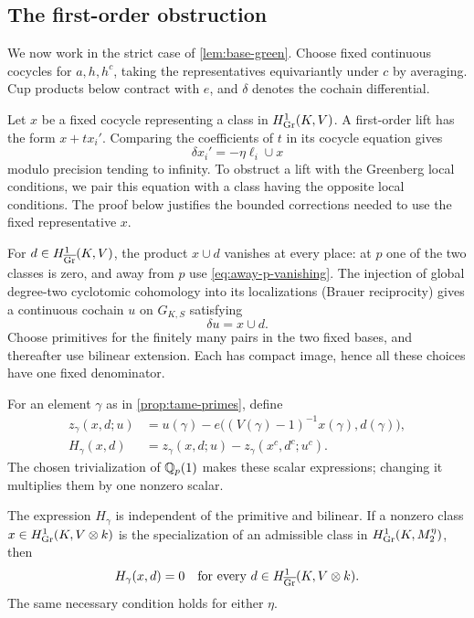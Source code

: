 \subsection{The first-order obstruction}

We now work in the strict case of \cref{lem:base-green}.  Choose
fixed continuous cocycles for $a,h,h^c$, taking the representatives
equivariantly under $c$ by averaging.  Cup products below contract
with $e$, and $\delta$ denotes the cochain differential.

Let $x$ be a fixed cocycle representing a class in
$H^1_{\operatorname{Gr}}(K,V)$.  A first-order lift has the form $x+t x_i'$.
Comparing the coefficients of $t$ in its cocycle
equation gives
\begin{equation}\label{eq:linear-lift}
 \delta x_i'=-\eta\ell_i\cup x
\end{equation}
modulo precision tending to infinity.  To obstruct a lift with the
Greenberg local conditions, we pair this equation with a class
having the opposite local conditions.  The proof below justifies
the bounded corrections needed to use the fixed representative $x$.

For $d\in H^1_{\overline{\operatorname{Gr}}}(K,V)$, the
product $x\cup d$ vanishes at every place: at $p$ one of the two
classes is zero, and away from $p$ use
\cref{eq:away-p-vanishing}.  The injection of global degree-two
cyclotomic cohomology into its localizations (Brauer reciprocity)
gives a continuous cochain $u$ on $G_{K,S}$ satisfying
\begin{equation}\label{eq:cup-primitive}
 \delta u=x\cup d.
\end{equation}
Choose primitives for the finitely many pairs in the two fixed
bases, and thereafter use bilinear extension.  Each has compact
image, hence all these choices have one fixed denominator.

For an element $\gamma$ as in \cref{prop:tame-primes}, define
\begin{align}
 z_\gamma(x,d;u)
 &=u(\gamma)-e\bigl((V(\gamma)-1)^{-1}x(\gamma),d(\gamma)\bigr),
 \label{eq:corrected-primitive}\\
 H_\gamma(x,d)
 &=z_\gamma(x,d;u)-z_\gamma(x^c,d^c;u^c).
 \label{eq:obstruction-pairing}
\end{align}
The chosen trivialization of $\mathbb Q_p(1)$ makes these scalar
expressions; changing it multiplies them by one nonzero scalar.

\begin{lemma}\label{lem:obstruction-necessary}
The expression $H_\gamma$ is independent of the primitive and
bilinear.  If a nonzero class $x\in H^1_{\operatorname{Gr}}(K,V\otimes k)$ is the
specialization of an admissible class in
$H^1_{\mathrm{Gr}}(K,M_2^{\eta})$, then
\begin{equation}\label{eq:obstruction-vanishing}
 H_\gamma(x,d)=0
 \quad\text{for every }d\in H^1_{\overline{\operatorname{Gr}}}(K,V\otimes k).
\end{equation}
The same necessary condition holds for either $\eta$.
\end{lemma}


